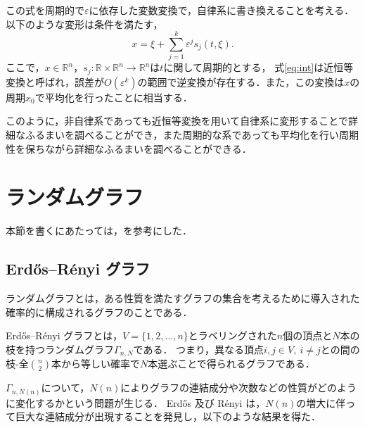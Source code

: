 \documentclass[../main]{subfiles}
\begin{document}
この式を周期的で$\varepsilon$に依存した変数変換で，自律系に書き換えることを考える．
以下のような変形は条件を満たす，
\begin{equation}
    \label{eq:int}
    x=\xi+\sum_{j=1}^k \varepsilon^j s_j(t,\xi).
\end{equation}
ここで，$x\in\mathbb{R}^n$，$s_j:\mathbb{R}\times\mathbb{R}^n\to\mathbb{R}^n$は$t$に関して周期的とする，
式\eqref{eq:int}は近恒等変換と呼ばれ，誤差が$O(\varepsilon^k)$の範囲で逆変換が存在する．また，この変換は$x$の周期$x_0$で平均化を行ったことに相当する．

このように，非自律系であっても近恒等変換を用いて自律系に変形することで詳細なふるまいを調べることができ，また周期的な系であっても平均化を行い周期性を保ちながら詳細なふるまいを調べることができる．
\section{ランダムグラフ}
本節を書くにあたっては，\cite{Bollobas2013,Albert2002}を参考にした．
\subsection{Erd\H{o}s–R\'{e}nyi グラフ}
\label{sec:er-graph}
ランダムグラフとは，ある性質を満たすグラフの集合を考えるために導入された確率的に構成されるグラフのことである．

Erd\H{o}s–R\'{e}nyi グラフとは，$V=\{1,2,\ldots,n\}$とラベリングされた$n$個の頂点と$N$本の枝を持つランダムグラフ$\Gamma_{n,N}$である．
つまり，異なる頂点$i,j\in V,\ i\neq j$との間の枝-全$\binom{n}{2}$本から等しい確率で$N$本選ぶことで得られるグラフである．

$\Gamma_{n,N(n)}$について，$N(n)$によりグラフの連結成分や次数などの性質がどのように変化するかという問題が生じる．
Erd\H{o}s 及び R\'{e}nyi は，$N(n)$の増大に伴って巨大な連結成分が出現することを発見し，以下のような結果を得た．
\end{document}
